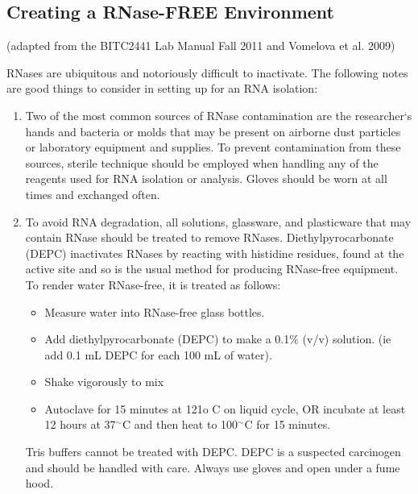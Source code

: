 \documentclass[11pt, oneside]{article}
\begin{document}
		\newpage

	\subsection{Creating a RNase-FREE Environment}
	
		(adapted from the BITC2441 Lab Manual Fall 2011 and Vomelova et al. 2009)
	
		\vspace{3mm}
	
		\noindent RNases are ubiquitous and notoriously difficult to inactivate. The following notes are good things to consider in setting up for an RNA 		isolation: 
		
		\begin{enumerate}
		
			\item Two of the most common sources of RNase contamination are the researcher`s hands and bacteria or molds that may be present on 			airborne dust particles or laboratory equipment and supplies. To prevent contamination from these sources, sterile technique should be 				employed when handling any of the reagents used for RNA isolation or analysis. Gloves should be worn at all times and exchanged often.  

			\item To avoid RNA degradation, all solutions, glassware, and plasticware that may contain RNase should be treated to remove RNases. 				Diethylpyrocarbonate (DEPC) inactivates RNases by reacting with histidine residues, found at the active site and so is the usual method for 			producing RNase-free equipment. To render water RNase-free, it is treated as follows: 
				
			\begin{itemize}
				\itemsep0em
				\item Measure water into RNase-free glass bottles. 
				\item Add diethylpyrocarbonate (DEPC) to make a 0.1\% (v/v) solution. (ie add 0.1 mL  DEPC for each 100 mL of water). 
				\item Shake vigorously to mix 
				\item Autoclave for 15 minutes at 121o C on liquid cycle, OR incubate at least 12 hours at 37$^{\sim}$C and then heat to 100$^{\sim}$C 				for 15 minutes. 
			\end{itemize}
				
			 Tris buffers cannot be treated with DEPC. DEPC is a suspected carcinogen and should be handled with care. Always 			use gloves and open under a fume hood. 


\end{enumerate}
\end{document}
